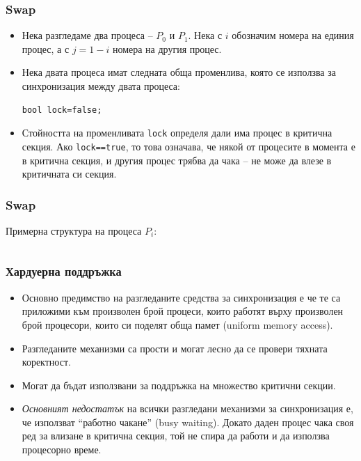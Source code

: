 \documentclass[ignorenonframetext, hyperref=unicode]{beamer}
\begin{document}
\begin{frame}[containsverbatim]
\frametitle{Swap}
\begin{itemize}
\item Нека разгледаме два процеса -- $P_0$ и $P_1$. Нека с $i$ обозначим
  номера на единия процес, а с $j=1-i$ номера на другия процес.
\item Нека двата процеса имат следната обща променлива, която се използва за
синхронизация между двата процеса: 
\begin{lstlisting}[numbers=none]
bool lock=false;
\end{lstlisting}
\item Стойността на променливата \lstinline{lock} определя дали има процес в
критична секция. Ако \lstinline{lock==true}, то това означава, че някой от
процесите в момента е в критична секция, и другия процес трябва да чака -- не
може да влезе в критичната си секция.
\end{itemize}
\end{frame}


\begin{frame}[containsverbatim]
\frametitle{Swap}
Примерна структура на процеса $P_i$:
\begin{columns}
\end{columns}
\end{frame}

\begin{frame}[containsverbatim]
\frametitle{Хардуерна поддръжка}
\begin{itemize}
\item Основно предимство на разгледаните средства за синхронизация е че те са
приложими към произволен брой процеси, които работят върху произволен брой
процесори, които си поделят обща памет (uniform memory access).
\item Разгледаните механизми са прости и могат лесно да се провери тяхната
коректност.
\item Могат да бъдат използвани за поддръжка на множество критични
секции.
\item {\em Основният недостатък} на всички разгледани механизми за синхронизация
е, че използват ``работно чакане'' (busy waiting). Докато даден процес чака своя ред
за влизане в критична секция, той не спира да работи и да използва процесорно
време.
\end{itemize}
\end{frame}
\end{document}
